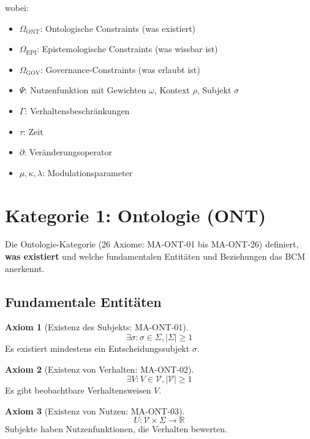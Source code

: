 \documentclass[11pt,a4paper]{article}
\theoremstyle{definition}
\newtheorem{axiom}{Axiom}[section]
\theoremstyle{plain}
\newcommand{\BCM}{\textsc{BCM}}
\begin{document}
wobei:
\begin{itemize}
    \item $\Omega_{\text{ONT}}$: Ontologische Constraints (was existiert)
    \item $\Omega_{\text{EPI}}$: Epistemologische Constraints (was wissbar ist)
    \item $\Omega_{\text{GOV}}$: Governance-Constraints (was erlaubt ist)
    \item $\Psi$: Nutzenfunktion mit Gewichten $\omega$, Kontext $\rho$, Subjekt $\sigma$
    \item $\Gamma$: Verhaltensbeschränkungen
    \item $\tau$: Zeit
    \item $\partial$: Veränderungsoperator
    \item $\mu, \kappa, \lambda$: Modulationsparameter
\end{itemize}

\section{Kategorie 1: Ontologie (ONT)}

Die Ontologie-Kategorie (26 Axiome: MA-ONT-01 bis MA-ONT-26) definiert, \textbf{was existiert} und welche fundamentalen Entitäten und Beziehungen das \BCM{} anerkennt.

\subsection{Fundamentale Entitäten}

\begin{axiom}[Existenz des Subjekts: MA-ONT-01]
\begin{equation}
\exists \sigma: \sigma \in \Sigma, |\Sigma| \geq 1
\end{equation}
Es existiert mindestens ein Entscheidungssubjekt $\sigma$.
\end{axiom}

\begin{axiom}[Existenz von Verhalten: MA-ONT-02]
\begin{equation}
\exists V: V \in \mathcal{V}, |\mathcal{V}| \geq 1
\end{equation}
Es gibt beobachtbare Verhaltensweisen $V$.
\end{axiom}

\begin{axiom}[Existenz von Nutzen: MA-ONT-03]
\begin{equation}
U: \mathcal{V} \times \Sigma \rightarrow \mathbb{R}
\end{equation}
Subjekte haben Nutzenfunktionen, die Verhalten bewerten.
\end{axiom}
\end{document}
